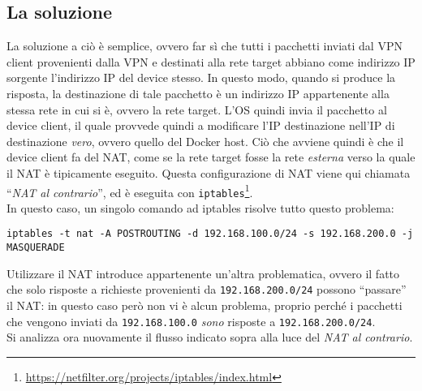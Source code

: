 \subsection{La soluzione}
La soluzione a ciò è semplice, ovvero far sì che tutti i pacchetti inviati dal
VPN client provenienti dalla VPN e destinati alla rete target abbiano come
indirizzo IP sorgente l'indirizzo IP del device stesso. In questo modo, quando si
produce la risposta, la destinazione di tale pacchetto è un indirizzo IP appartenente
alla stessa rete in cui si è, ovvero la rete target. L'OS quindi invia il
pacchetto al device client, il quale provvede quindi a modificare
l'IP destinazione nell'IP di destinazione \textit{vero}, ovvero quello del Docker host.
Ciò che avviene quindi è che il device client fa del NAT, come se la rete target
fosse la rete \textit{esterna} verso la quale il NAT è tipicamente eseguito. Questa
configurazione di NAT viene qui chiamata ``\textit{NAT al contrario}'', ed è eseguita con
\texttt{iptables}\footnote{\url{https://netfilter.org/projects/iptables/index.html}}.\\
In questo caso, un singolo comando ad iptables risolve tutto questo problema:
\begin{verbatim}
iptables -t nat -A POSTROUTING -d 192.168.100.0/24 -s 192.168.200.0 -j MASQUERADE
\end{verbatim}
Utilizzare il NAT introduce appartenente un'altra problematica, ovvero il fatto che
solo risposte a richieste provenienti da \texttt{192.168.200.0/24} possono ``passare''
il NAT: in questo caso però non vi è alcun problema, proprio perché i pacchetti che
vengono inviati da \texttt{192.168.100.0} \textit{sono} risposte a
\texttt{192.168.200.0/24}.\\
Si analizza ora nuovamente il flusso indicato sopra alla luce del \textit{NAT al contrario}.
